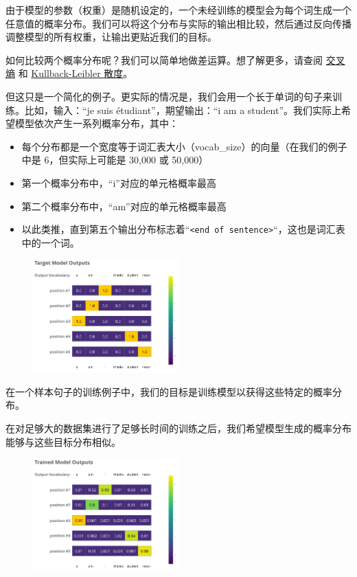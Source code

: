 \documentclass[cn,hazy,blue,10pt,normal]{elegantnote}
\begin{document}
由于模型的参数（权重）是随机设定的，一个未经训练的模型会为每个词生成一个任意值的概率分布。我们可以将这个分布与实际的输出相比较，然后通过反向传播调整模型的所有权重，让输出更贴近我们的目标。

如何比较两个概率分布呢？我们可以简单地做差运算。想了解更多，请查阅 \href{https://colah.github.io/posts/2015-09-Visual-Information/}{交叉熵} 和 \href{https://www.countbayesie.com/blog/2017/5/9/kullback-leibler-divergence-explained}{Kullback-Leibler 散度}。

但这只是一个简化的例子。更实际的情况是，我们会用一个长于单词的句子来训练。比如，输入：“je suis étudiant”，期望输出：“i am a student”。我们实际上希望模型依次产生一系列概率分布，其中：

\begin{itemize}
    \item 每个分布都是一个宽度等于词汇表大小（vocab\_size）的向量（在我们的例子中是 6，但实际上可能是 30,000 或 50,000）
    \item 第一个概率分布中，“i”对应的单元格概率最高
    \item 第二个概率分布中，“am”对应的单元格概率最高
    \item 以此类推，直到第五个输出分布标志着``\texttt{<end of sentence>}``，这也是词汇表中的一个词。
\end{itemize}

\begin{figure}[ht]
    \centering
    \includegraphics[width=0.5\textwidth]{image/output_target_probability_distributions.png}
\end{figure}

在一个样本句子的训练例子中，我们的目标是训练模型以获得这些特定的概率分布。

在对足够大的数据集进行了足够长时间的训练之后，我们希望模型生成的概率分布能够与这些目标分布相似。
\begin{figure}[ht]
	\vspace{-10mm}
    \centering
    \includegraphics[width=0.5\textwidth]{image/output_trained_model_probability_distributions.png}
\end{figure}
\end{document}
